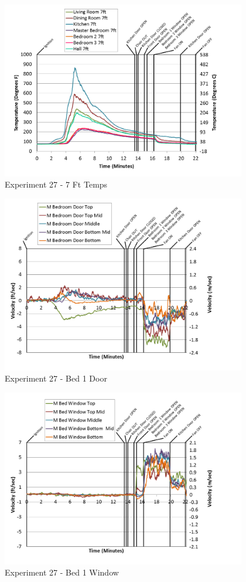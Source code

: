 \documentclass{article}
\begin{document}
\begin{appendices}
\begin{figure}[h!]
	\centering
	\includegraphics[height=3.05in]{0_Images/Results_Charts/Exp_27_Charts/7FtTemps.png}
	\caption{Experiment 27 - 7 Ft Temps}
\end{figure}

\clearpage

\begin{figure}[h!]
	\centering
	\includegraphics[height=3.05in]{0_Images/Results_Charts/Exp_27_Charts/Bed1Door.png}
	\caption{Experiment 27 - Bed 1 Door}
\end{figure}


\begin{figure}[h!]
	\centering
	\includegraphics[height=3.05in]{0_Images/Results_Charts/Exp_27_Charts/Bed1Window.png}
	\caption{Experiment 27 - Bed 1 Window}
\end{figure}


\end{appendices}
\end{document}
